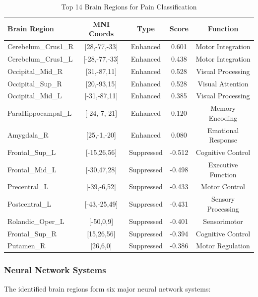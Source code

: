 \documentclass[10pt,journal,compsoc]{IEEEtran}
\begin{document}
\begin{table}[htbp]
\caption{Top 14 Brain Regions for Pain Classification}
\label{tab:brain_regions}
\centering
\small
\begin{tabular}{lcccc}
\toprule
Brain Region & MNI Coords & Type & Score & Function \\
\midrule
Cerebelum\_Crus1\_R & [28,-77,-33] & Enhanced & 0.601 & Motor Integration \\
Cerebelum\_Crus1\_L & [-28,-77,-33] & Enhanced & 0.438 & Motor Integration \\
Occipital\_Mid\_R & [31,-87,11] & Enhanced & 0.528 & Visual Processing \\
Occipital\_Sup\_R & [20,-93,15] & Enhanced & 0.528 & Visual Attention \\
Occipital\_Mid\_L & [-31,-87,11] & Enhanced & 0.385 & Visual Processing \\
ParaHippocampal\_L & [-24,-7,-21] & Enhanced & 0.120 & Memory Encoding \\
Amygdala\_R & [25,-1,-20] & Enhanced & 0.080 & Emotional Response \\
Frontal\_Sup\_L & [-15,26,56] & Suppressed & -0.512 & Cognitive Control \\
Frontal\_Mid\_L & [-30,47,28] & Suppressed & -0.498 & Executive Function \\
Precentral\_L & [-39,-6,52] & Suppressed & -0.433 & Motor Control \\
Postcentral\_L & [-43,-25,49] & Suppressed & -0.431 & Sensory Processing \\
Rolandic\_Oper\_L & [-50,0,9] & Suppressed & -0.401 & Sensorimotor \\
Frontal\_Sup\_R & [15,26,56] & Suppressed & -0.394 & Cognitive Control \\
Putamen\_R & [26,6,0] & Suppressed & -0.386 & Motor Regulation \\
\bottomrule
\end{tabular}
\end{table}

\subsubsection{Neural Network Systems}

The identified brain regions form six major neural network systems:
\end{document}
